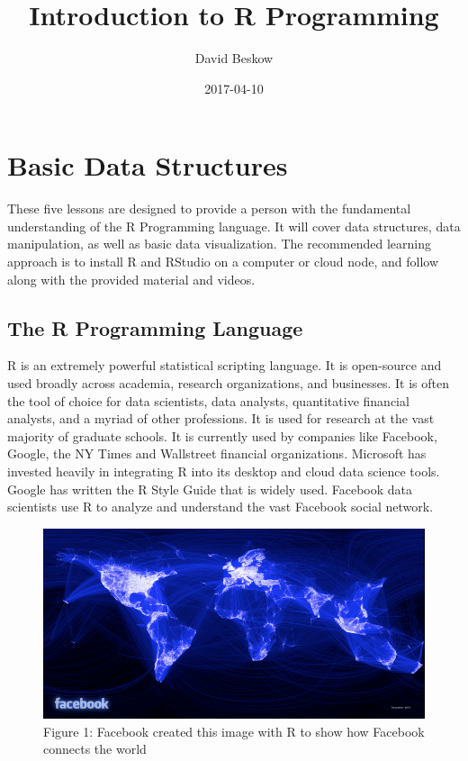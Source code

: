 \documentclass[]{book}
\title{Introduction to R Programming}
\author{David Beskow}
\date{2017-04-10}
\begin{document}
\maketitle

{
\setcounter{tocdepth}{1}
\tableofcontents
}
\chapter{Basic Data Structures}\label{basic-data-structures}

These five lessons are designed to provide a person with the fundamental
understanding of the R Programming language. It will cover data
structures, data manipulation, as well as basic data visualization. The
recommended learning approach is to install R and RStudio on a computer
or cloud node, and follow along with the provided material and videos.

\section{The R Programming Language}\label{the-r-programming-language}

R is an extremely powerful statistical scripting language. It is
open-source and used broadly across academia, research organizations,
and businesses. It is often the tool of choice for data scientists, data
analysts, quantitative financial analysts, and a myriad of other
professions. It is used for research at the vast majority of graduate
schools. It is currently used by companies like Facebook, Google, the NY
Times and Wallstreet financial organizations. Microsoft has invested
heavily in integrating R into its desktop and cloud data science tools.
Google has written the R Style Guide that is widely used. Facebook data
scientists use R to analyze and understand the vast Facebook social
network.

\begin{figure}[htbp]
\centering
\includegraphics{facebook.png}
\caption{Figure 1: Facebook created this image with R to show how
Facebook connects the world}
\end{figure}
\end{document}
